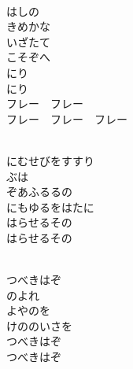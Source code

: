 \documentclass[10pt,b5j]{tarticle} %
\begin{document}
\vspace{1.5em} %
\newcommand{\linespace}{0.5em} %
\newcommand{\blocksize}{0.5\hsize} %
\newcommand{\itemmargin}{6em} %
\begin{enumerate} %
    \setlength{\itemindent}{\itemmargin} %
    \begin{minipage}[c]{\blocksize}
    
        \vspace{\linespace}
        \item~\\
        はしの\\
        きめかな\\
        いざたて\\
        こそぞへ\\
        にり\\
        にり\\
        フレー　フレー\\
        フレー　フレー　フレー
        
        \vspace{\linespace}
        \item~\\
        にむせびをすすり\\
        ぶは\\
        ぞあふるるの\\
        にもゆるをはたに\\
        はらせるその\\
        はらせるその
        
        \vspace{\linespace}
        \item~\\
        つべきはぞ\\
        のよれ\\
        よやのを\\
        けののいさを\\
        つべきはぞ\\
        つべきはぞ
    
    \end{minipage}
\end{enumerate} %
\end{document}
